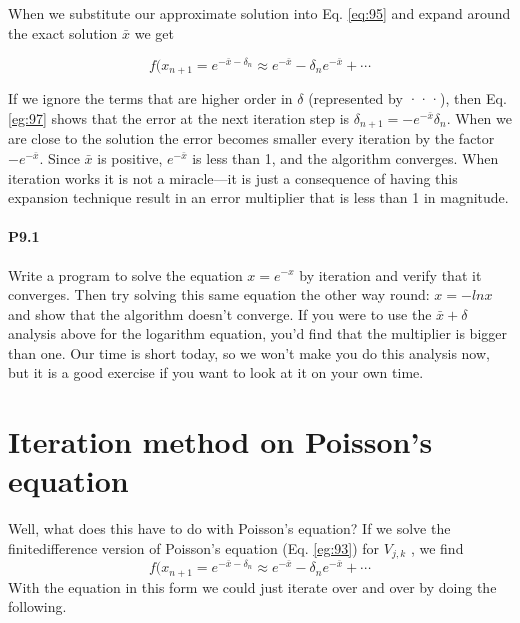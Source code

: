 \documentclass{book}
\theoremstyle{plain}
\theoremstyle{definition}
\numberwithin{exm}{chapter}
\theoremstyle{remark}
\theoremstyle{summary}
\theoremstyle{overview}
\begin{document}
When we substitute our approximate solution into 
Eq. \eqref{eq:95} and 
expand around the exact solution $ \bar{x} $ we get

\begin{equation}\label{eq:97}
f(x_{n+1}=e^{-\bar{x}-\delta_{n}} \approx e^{-\bar{x}}-\delta_{n} e^{-\bar{x}}+\cdots
\end{equation}

If we ignore the terms that are higher order in $\delta$ (represented by ···), then Eq. \eqref{eg:97}
shows that the error at the next iteration step is $\delta_{n+1} = −e^{−\bar{x}}\delta_n$. When we are close
to the solution the error becomes smaller every iteration by the factor $−e^{-\bar{x}}$. Since $\bar{x}$ is positive, $e^{-\bar{x}}$ is less than 1, and the algorithm converges. When iteration works
it is not a miracle—it is just a consequence of having this expansion technique
result in an error multiplier that is less than 1 in magnitude.

\paragraph*{P9.1}
Write a program to solve the equation $x = e^{−x}$ by iteration and verify that
it converges. Then try solving this same equation the other way round:
$x = −ln x$ and show that the algorithm doesn\rq t converge. If you were to
use the $\bar{x} +\delta$ analysis above for the logarithm equation, you\rq d find that the
multiplier is bigger than one. Our time is short today, so we won\rq t make you
do this analysis now, but it is a good exercise if you want to look at it on
your own time.


\section*{Iteration method on Poisson\rq s equation}
Well, what does this have to do with Poisson\rq s equation? If we solve the finitedifference version of Poisson\rq s equation (Eq. \eqref{eg:93}) for $V_{j,k}$ , we find
\begin{equation}\label{eq:98}
f(x_{n+1}=e^{-\bar{x}-\delta_{n}} \approx e^{-\bar{x}}-\delta_{n} e^{-\bar{x}}+\cdots
\end{equation}
With the equation in this form we could just iterate over and over by doing the
following.
\end{document}
